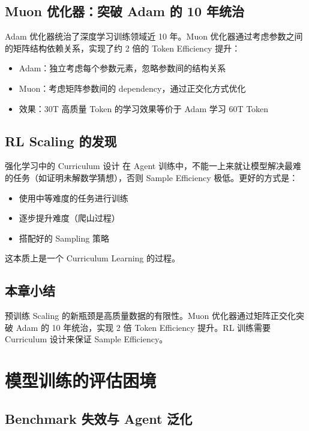 \documentclass[a4paper]{article}
\begin{document}
\subsection{Muon 优化器：突破 Adam 的 10 年统治}

Adam 优化器统治了深度学习训练领域近 10 年。Muon 优化器通过考虑参数之间的矩阵结构依赖关系，实现了约 2 倍的 Token Efficiency 提升：

\begin{itemize}
    \item Adam：独立考虑每个参数元素，忽略参数间的结构关系
    \item Muon：考虑矩阵参数间的 dependency，通过正交化方式优化
    \item 效果：30T 高质量 Token 的学习效果等价于 Adam 学习 60T Token
\end{itemize}

\subsection{RL Scaling 的发现}

\begin{knowledgebox}{强化学习中的 Curriculum 设计}
在 Agent 训练中，不能一上来就让模型解决最难的任务（如证明未解数学猜想），否则 Sample Efficiency 极低。更好的方式是：
\begin{itemize}
    \item 使用中等难度的任务进行训练
    \item 逐步提升难度（爬山过程）
    \item 搭配好的 Sampling 策略
\end{itemize}
这本质上是一个 Curriculum Learning 的过程。
\end{knowledgebox}

\subsection{本章小结}

预训练 Scaling 的新瓶颈是高质量数据的有限性。Muon 优化器通过矩阵正交化突破 Adam 的 10 年统治，实现 2 倍 Token Efficiency 提升。RL 训练需要 Curriculum 设计来保证 Sample Efficiency。


\section{模型训练的评估困境}

\subsection{Benchmark 失效与 Agent 泛化}
\end{document}

